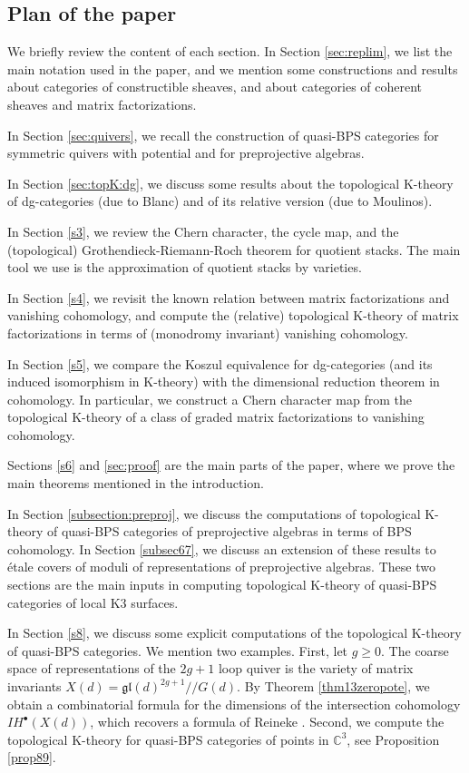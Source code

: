 \documentclass [11pt,oneside,a4paper,mathscr]{amsart}
\theoremstyle{definition}
\renewcommand{\geq}{\geqslant}
\newcommand{\ssslash}{/\!\!/}
\begin{document}
\subsection{Plan of the paper}

We briefly review the content of each section. In Section \ref{sec:replim}, we list the main notation used in the paper, and we mention some constructions and results about categories of constructible sheaves, and about categories of coherent sheaves and matrix factorizations. 

In Section \ref{sec:quivers}, we recall the construction of quasi-BPS categories for symmetric quivers with potential and for preprojective algebras.

In Section \ref{sec:topK:dg}, we discuss some results about the topological K-theory of dg-categories (due to Blanc) and of its relative version (due to Moulinos).


In Section \ref{s3}, we review the Chern character, the cycle map, and the (topological) Grothendieck-Riemann-Roch theorem for quotient stacks. The main tool we use is the approximation of quotient stacks by varieties. 

In Section \ref{s4}, we revisit the known relation between matrix factorizations and vanishing cohomology, and compute the (relative) topological K-theory of matrix factorizations in terms of (monodromy invariant) vanishing cohomology.



In Section \ref{s5}, we compare the Koszul equivalence for dg-categories (and its induced isomorphism in K-theory) with the dimensional reduction theorem in cohomology. In particular, we construct a Chern character map from the topological K-theory of a class of graded matrix factorizations to vanishing cohomology.


Sections \ref{s6} and \ref{sec:proof} are the main parts of the paper, where we prove the main theorems mentioned in the introduction.

In Section \ref{subsection:preproj}, 
we discuss the computations of topological K-theory of quasi-BPS categories of preprojective algebras in terms of BPS cohomology. In Section \ref{subsec67}, we discuss an extension of these results to étale covers of moduli of representations of preprojective algebras. These two sections are the main inputs in computing topological K-theory of quasi-BPS categories of local K3 surfaces.  

In Section \ref{s8}, we discuss some explicit computations of the topological K-theory of quasi-BPS categories. We mention two examples. First, let $g\geq 0$. The coarse space of representations of the $2g+1$ loop quiver is the variety of matrix invariants $X(d)=\mathfrak{gl}(d)^{2g+1}\ssslash G(d)$.
By Theorem \ref{thm13zeropote}, we obtain a combinatorial formula for the dimensions of the intersection cohomology $I\!H^\bullet(X(d))$, which recovers a formula of Reineke \cite{MR2889742}. Second, we compute the topological K-theory for quasi-BPS categories of points in $\mathbb{C}^3$, see Proposition \ref{prop89}. 
\end{document}
